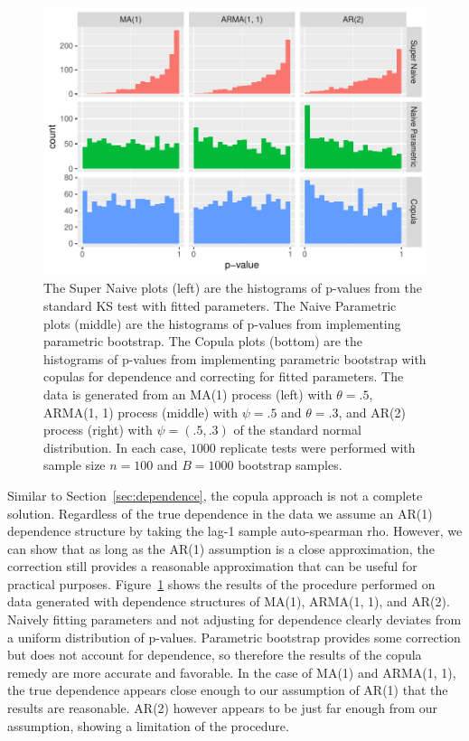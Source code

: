 \documentclass[12pt, letterpaper, titlepage]{article}
\begin{document}
\begin{figure}[tbp]
  \centering
  \includegraphics[width=\textwidth]{hist_ma1_arma_ar2_FD}
  \caption{The Super Naive plots (left) are the histograms of p-values from the 
  standard KS test with fitted parameters. The Naive Parametric plots (middle) 
  are the histograms of p-values from implementing parametric bootstrap. The 
  Copula plots (bottom) are the histograms of p-values from implementing 
  parametric bootstrap with copulas for dependence and correcting for fitted 
  parameters. The data is generated from an MA(1) process (left) with 
  $\theta = .5$, ARMA(1, 1) process (middle) with $\psi = .5$ and $\theta = .3$,
  and AR(2) process (right) with $\psi = (.5, .3)$ of the standard normal 
  distribution. In each case, $1000$ replicate tests were performed with sample 
  size $n = 100$ and $B = 1000$ bootstrap samples.}
  \label{fig:hist_ma1_arma_ar2_FD}
\end{figure}

Similar to Section~\ref{sec:dependence}, the copula approach is not a complete 
solution. Regardless of the true dependence in the data we assume an AR(1) 
dependence structure by taking the lag-1 sample auto-spearman rho. However, we 
can show that as long as the AR(1) assumption is a close approximation, the 
correction still provides a reasonable approximation that can be useful for 
practical purposes. Figure~\ref{fig:hist_ma1_arma_ar2_FD} shows the results of the 
procedure performed on data generated with dependence structures of  MA(1), 
ARMA(1, 1), and AR(2). Naively fitting parameters and not adjusting for 
dependence clearly deviates from a uniform distribution of p-values. Parametric 
bootstrap provides some correction but does not account for dependence, so 
therefore the results of the copula remedy are more accurate and favorable.
In the case of MA(1) and ARMA(1, 1), the true dependence appears close enough 
to our assumption of AR(1) that the results are reasonable. AR(2) however
appears to be just far enough from our assumption, showing a limitation of the 
procedure.
\end{document}
